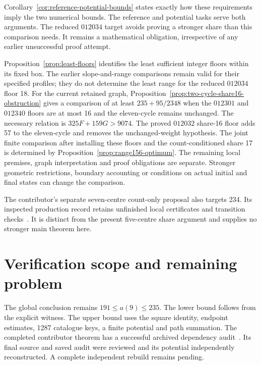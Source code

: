 \documentclass[11pt,a4paper]{article}
\theoremstyle{definition}
\theoremstyle{remark}
\begin{document}
Corollary~\ref{cor:reference-potential-bounds} states exactly how these
requirements imply the two numerical bounds. The reference and potential
tasks serve both arguments. The reduced $012034$ target avoids proving a
stronger share than this comparison needs. It remains a mathematical
obligation, irrespective of any earlier unsuccessful proof attempt.

Proposition~\ref{prop:least-floors} identifies the least sufficient integer
floors within its fixed box. The earlier slope-and-range comparisons remain
valid for their specified profiles; they do not determine the least range
for the reduced $012034$ floor 18. For the current retained graph,
Proposition~\ref{prop:two-cycle-share16-obstruction} gives a comparison of at
least $235+95/2348$ when the $012301$ and $012340$ floors are at most 16
and the eleven-cycle remains unchanged. The necessary relation is
$325F+159G>9074$. The proved $012032$ share-16 floor adds 57 to the
eleven-cycle and removes the unchanged-weight hypothesis. The joint finite comparison after installing these floors and the
count-conditioned share 17 is determined by
Proposition~\ref{prop:range156-optimum}. The remaining local premises,
graph interpretation and proof obligations are separate. Stronger geometric restrictions, boundary
accounting or conditions on actual initial and final states can change
the comparison.

The contributor's separate seven-centre count-only proposal also targets 234.
Its inspected production record retains unfinished local certificates and
transition checks~\cite{conditional234archive}. It is distinct from the present
five-centre share argument and supplies no stronger main theorem here.

\section{Verification scope and remaining problem}\label{sec:verification}
The global conclusion remains $191\le a(9)\le235$. The lower bound follows
from the explicit witness. The upper bound uses the square identity,
endpoint estimates, 1287 catalogue keys, a finite potential and path
summation. The completed contributor theorem has a successful archived
dependency audit~\cite{bound235archive}. Its final source and saved audit were
reviewed and its potential independently reconstructed. A complete
independent rebuild remains pending.
\end{document}
